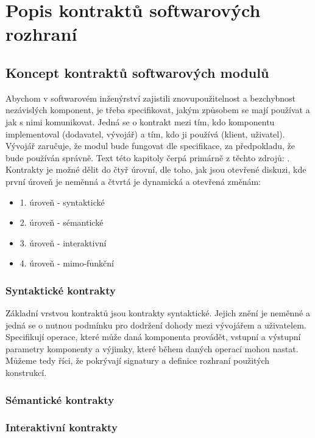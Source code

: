 \chapter{Popis kontraktů softwarových rozhraní}

	\section{Koncept kontraktů softwarových modulů}	
		Abychom v softwarovém inženýrství zajistili znovupoužitelnost a bezchybnost nezávislých komponent, je třeba specifikovat, jakým způsobem se mají používat a jak s nimi komunikovat. Jedná se o kontrakt mezi tím, kdo komponentu implementoval (dodavatel, vývojář) a tím, kdo ji používá (klient, uživatel). Vývojář zaručuje, že modul bude fungovat dle specifikace, za předpokladu, že bude používán správně. Text této kapitoly čerpá primárně z těchto zdrojů: \cite{contractsInWild}\cite{applyingDbc}\cite{ooswConstruction}\cite{contractAware}.\\
		
		Kontrakty je možné dělit do čtyř úrovní, dle toho, jak jsou otevřené diskuzi, kde první úroveň je neměnná a čtvrtá je dynamická a otevřená změnám: 
		\begin{itemize}
			\item 1. úroveň - syntaktické
			\item 2. úroveň - sémantické
			\item 3. úroveň - interaktivní
			\item 4. úroveň - mimo-funkční
		\end{itemize}
		
		\subsection{Syntaktické kontrakty}
			Základní vrstvou kontraktů jsou kontrakty syntaktické. Jejich znění je neměnné a jedná se o nutnou podmínku pro dodržení dohody mezi vývojářem a uživatelem. Specifikují operace, které může daná komponenta provádět, vstupní a výstupní parametry komponenty a výjimky, které během daných operací mohou nastat. Můžeme tedy říci, že pokrývají signatury a definice rozhraní použitých konstrukcí. 
		
		\subsection{Sémantické kontrakty}
		
		\subsection{Interaktivní kontrakty}
		
